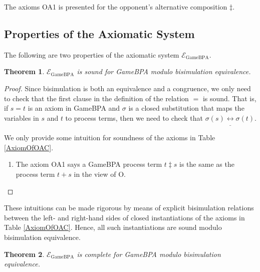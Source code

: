 \documentclass{fac}
\newtheorem{theorem}{Theorem}[section]
\begin{document}
The axioms OA1 is presented for the opponent's alternative composition $\ddagger$.

\subsection{Properties of the Axiomatic System}

The following are two properties of the axiomatic system $\mathcal{E}_{\textrm{GameBPA}}$.

\begin{theorem}
$\mathcal{E}_{\textrm{GameBPA}}$  is sound for GameBPA modulo bisimulation equivalence.
\end{theorem}

\begin{proof}
Since bisimulation is both an equivalence and a congruence, we only need to check that the first clause in the definition of the relation $=$ is sound.
That is, if $s=t$ is an axiom in GameBPA and $\sigma$ is a closed substitution that maps the variables in $s$ and $t$ to process terms, then we need to check that $\sigma(s)\underline{\leftrightarrow}\sigma(t)$.

We only provide some intuition for soundness of the axioms in Table \ref{AxiomOfOAC}.

\begin{enumerate}
  \item The axiom OA1 says a GameBPA process term $t \ddagger s$ is the same as the process term $t + s$ in the view of O.
\end{enumerate}
\end{proof}

These intuitions can be made rigorous by means of explicit bisimulation relations between the left- and right-hand sides of closed instantiations of the axioms in Table \ref{AxiomOfOAC}. Hence, all such instantiations are sound modulo bisimulation equivalence.

\begin{theorem}
$\mathcal{E}_{\textrm{GameBPA}}$ is complete for GameBPA modulo bisimulation equivalence.
\end{theorem}
\end{document}
